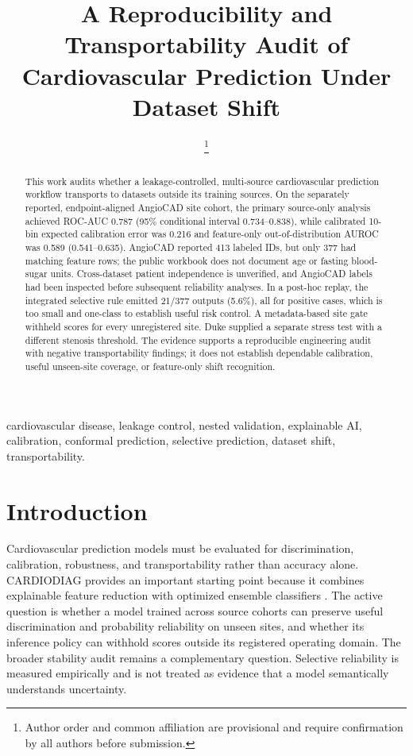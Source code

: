 \documentclass[journal]{IEEEtran}
\title{A Reproducibility and Transportability Audit of Cardiovascular Prediction Under Dataset Shift}
\author{\IEEEauthorblockN{Akhil Preetham E, Ch Hari Krishna, G Vennela}
\IEEEauthorblockA{\textit{Department of Computer Science and Engineering}\\
\textit{Prasad V. Potluri Siddhartha Institute of Technology}\\
Vijayawada, Andhra Pradesh, India}
\thanks{Author order and common affiliation are provisional and require
confirmation by all authors before submission.}}
\begin{document}
\maketitle

\begin{abstract}
This work audits whether a leakage-controlled, multi-source cardiovascular
prediction workflow transports to datasets outside its training sources. On the
separately reported, endpoint-aligned AngioCAD site cohort, the primary
source-only analysis achieved
ROC-AUC 0.787 (95\% conditional interval 0.734--0.838), while calibrated
10-bin expected calibration error was 0.216 and feature-only out-of-distribution
AUROC was 0.589 (0.541--0.635). AngioCAD reported 413 labeled IDs, but only 377
had matching feature rows; the public workbook does not document age or fasting
blood-sugar units. Cross-dataset patient independence is unverified, and
AngioCAD labels had been inspected before subsequent reliability analyses. In
a post-hoc replay, the integrated selective rule emitted
21/377 outputs (5.6\%), all for positive cases, which is too small and
one-class to establish useful risk control. A metadata-based site gate
withheld scores for every unregistered site. Duke supplied a separate stress
test with a different stenosis threshold. The evidence supports a reproducible
engineering audit with negative transportability findings; it does not
establish dependable calibration, useful unseen-site coverage, or feature-only
shift recognition.
\end{abstract}

\begin{IEEEkeywords}
cardiovascular disease, leakage control, nested validation, explainable AI,
calibration, conformal prediction, selective prediction, dataset shift,
transportability.
\end{IEEEkeywords}

\section{Introduction}
Cardiovascular prediction models must be evaluated for discrimination,
calibration, robustness, and transportability rather than accuracy alone.
CARDIODIAG provides an important starting point because it combines explainable
feature reduction with optimized ensemble classifiers \cite{khan2026cardiodiag}.
The active question is whether a model trained across source cohorts can
preserve useful discrimination and probability reliability on unseen sites,
and whether its inference policy can withhold scores outside its registered
operating domain. The broader stability audit remains a complementary
question. Selective reliability is measured empirically and is not treated as
evidence that a model semantically understands uncertainty.
\end{document}
